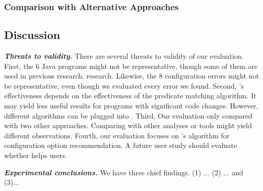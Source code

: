 \subsubsection{Comparison with Alternative Approaches}
\label{sec:alternative}



\subsection{Discussion}

\noindent \textbf{\textit{Threats to validity.}}
There are several threats to validity of our evaluation.
First, the 6 Java programs might not be representative, though some of them are used
in previous research. research. Likewise, the
8 configuration errors might not be representative, even though we
evaluated every error we found. Second, 
\ourtool's effectiveness depends on the effectiveness of the
predicate matching algorithm. It may yield less
useful results for programs with significant code changes.
However, different algorithms can be plugged into \ourtool.
Third, Our evaluation only compared \ourtool with two other
approaches. Comparing with other analyses or tools might yield
different observations.
Fourth, our evaluation focuses on \ourtool's algorithm for
configuration option recommendation. A future user study should
evaluate whether \ourtool helps users.

\vspace{1mm}

\noindent \textbf{\textit{Experimental conclusions.}}
We have three chief findings. (1) ...  (2) ... and (3)...

